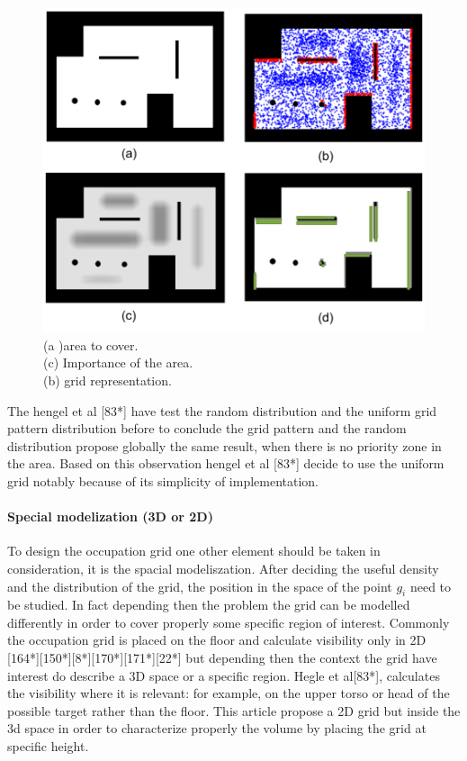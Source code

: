 \begin{figure}[t!]
   \includegraphics[width=\linewidth]{img/randomGridRef171.png}
  \caption{ (a )area  to cover.\\   
(c) Importance of the area.\\  
(b) grid representation.}\label{fig:randomGridRef171}
  \endminipage\hfill
\end{figure}

The hengel et al [83*] have test the random distribution and the uniform grid pattern distribution before to conclude the grid pattern and the random distribution propose globally the same result, when there is no priority zone in the area. Based on this observation hengel et al [83*] decide to use the uniform grid notably because of its simplicity of implementation.\\

\paragraph*{ Special modelization (3D  or 2D)}
To design the occupation grid one other element should be taken in consideration, it is the spacial modeliszation. After deciding the useful density and the distribution of the grid, the position in the space of the point $g_i$ need to be studied.   %
In fact depending then the problem the grid can be modelled differently in order to cover properly some specific region of interest. Commonly  the occupation grid is placed on the floor and calculate visibility only in 2D  [164*][150*][8*][170*][171*][22*] but depending then the context the grid have interest do describe a 3D space or a specific region.  
Hegle et al[83*], calculates the visibility where it is relevant: for example, on the upper torso or head of the possible target rather than the floor. This article  propose a 2D grid but inside the 3d space in order to  characterize properly the volume by placing the grid at specific height.  \\


